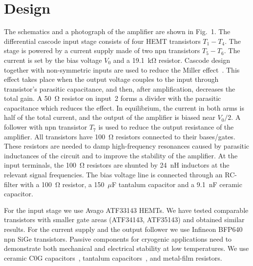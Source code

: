\documentclass{twocol}
\begin{document}
\section{Design}

The schematics and a photograph of the amplifier are shown in Fig.~1. The
differential cascode input stage consists of four HEMT transistors
$T_1-T_4$. The stage is powered by a current supply made of two npn
transistors $T_5-T_6$. The current is set by the bias voltage $V_0$ and a
19.1~k$\mathrm{\Omega}$ resistor. Cascode design together with non-symmetric
inputs are used to reduce the Miller effect~\cite{miller}. This effect takes
place when the output voltage couples to the input through transistor's
parasitic capacitance, and then, after amplification, decreases the total
gain. A 50~$\mathrm{\Omega}$ resistor on input~2 forms a divider with the
parasitic capacitance which reduces the effect. In equilibrium, the
current in both arms is half of the total current, and the output of
the amplifier is biased near $V_0/2$. A follower with npn
transistor $T_7$ is used to reduce the output resistance of the
amplifier. All transistors have 100~$\mathrm{\Omega}$ resistors connected to their
bases/gates. These resistors are needed to damp high-frequency resonances
caused by parasitic inductances of the circuit and to improve the stability of the amplifier. 
At the input terminals, the 100~$\mathrm{\Omega}$ resistors are shunted
by 24~nH inductors at the relevant signal frequencies. The bias voltage
line is connected through an RC-filter with a 100~$\mathrm{\Omega}$ resistor, a
150~$\mu$F tantalum capacitor and a 9.1~nF ceramic capacitor.

For the input stage we use Avago ATF33143 HEMTs. We have tested
comparable transistors with smaller gate areas (ATF34143, ATF35143)  and
obtained similar results. For the current supply and the output follower
we use Infineon BFP640 npn SiGe transistors. Passive components for
cryogenic applications need to demonstrate both mechanical and electrical
stability at low temperatures. We use ceramic C0G
capacitors~\cite{2010_teyssandier}, tantalum
capacitors~\cite{2006_teverovsky}, and metal-film resistors.
\end{document}
